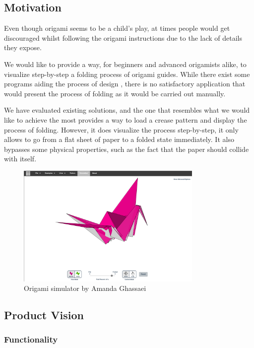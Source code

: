 \subsection{Motivation}

Even though origami seems to be a child's play, at times
people would get discouraged whilst following the origami instructions due to
the lack of details they expose.

We would like to provide a way, for beginners and advanced origamists alike, to visualize step-by-step a folding process of origami guides.
While there exist some programs aiding the process of design \cite{app:treemaker} \cite{app:omto} \cite{app:origami-draw}, there is no satisfactory application 
that would present the process of folding as it would be carried out manually.

We have evaluated existing solutions, and the one that resembles 
what we would like to achieve the most \cite{origami-simulator} provides a way to load a crease pattern
and display the process of folding. However, it does visualize the process step-by-step, it only allows 
to go from a flat sheet of paper to a folded state immediately. It also bypasses some physical properties, such as the fact that the
paper should collide with itself.


\begin{figure}[H]
\caption{Origami simulator by Amanda Ghassaei}
  \centering
    \includegraphics[width=0.8\textwidth]{assets/origami-simulator.png}
\end{figure}

\clearpage 

\subsection{Product Vision}

\subsubsection{Functionality}


